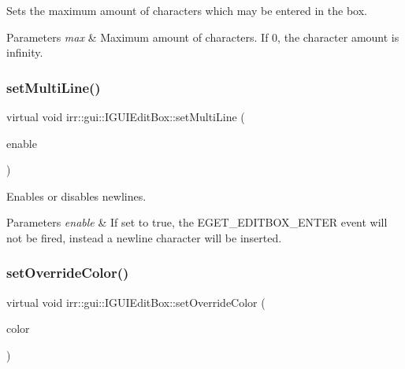 Sets the maximum amount of characters which may be entered in the box. 


\begin{DoxyParams}{Parameters}
{\em max} & Maximum amount of characters. If 0, the character amount is infinity. \\
\hline
\end{DoxyParams}
\mbox{\label{classirr_1_1gui_1_1IGUIEditBox_a0f68dc7ddc74d8103ba3ba4d445dbf9a}} 
\subsubsection{\texorpdfstring{set\+Multi\+Line()}{setMultiLine()}}
{\footnotesize\ttfamily virtual void irr\+::gui\+::\+I\+G\+U\+I\+Edit\+Box\+::set\+Multi\+Line (\begin{DoxyParamCaption}\item[{bool}]{enable }\end{DoxyParamCaption})\hspace{0.3cm}{\ttfamily [pure virtual]}}



Enables or disables newlines. 


\begin{DoxyParams}{Parameters}
{\em enable} & If set to true, the E\+G\+E\+T\+\_\+\+E\+D\+I\+T\+B\+O\+X\+\_\+\+E\+N\+T\+ER event will not be fired, instead a newline character will be inserted. \\
\hline
\end{DoxyParams}
\mbox{\label{classirr_1_1gui_1_1IGUIEditBox_aa134d2a36c52abcb4881da0267031c47}} 
\subsubsection{\texorpdfstring{set\+Override\+Color()}{setOverrideColor()}}
{\footnotesize\ttfamily virtual void irr\+::gui\+::\+I\+G\+U\+I\+Edit\+Box\+::set\+Override\+Color (\begin{DoxyParamCaption}\item[{\hyperlink{classirr_1_1video_1_1SColor}{video\+::\+S\+Color}}]{color }\end{DoxyParamCaption})\hspace{0.3cm}{\ttfamily [pure virtual]}}



